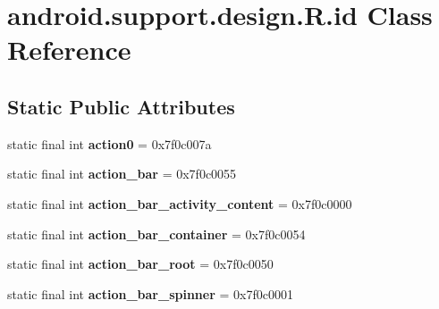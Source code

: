 \hypertarget{classandroid_1_1support_1_1design_1_1_r_1_1id}{}\section{android.\+support.\+design.\+R.\+id Class Reference}
\label{classandroid_1_1support_1_1design_1_1_r_1_1id}
\subsection*{Static Public Attributes}
\begin{DoxyCompactItemize}
\item 
\hypertarget{classandroid_1_1support_1_1design_1_1_r_1_1id_a65ca78d6559d5c73324d48f61d2af87e}{}static final int {\bfseries action0} = 0x7f0c007a\label{classandroid_1_1support_1_1design_1_1_r_1_1id_a65ca78d6559d5c73324d48f61d2af87e}

\item 
\hypertarget{classandroid_1_1support_1_1design_1_1_r_1_1id_a244052aff1f9058e9de1c6c346d3843e}{}static final int {\bfseries action\+\_\+bar} = 0x7f0c0055\label{classandroid_1_1support_1_1design_1_1_r_1_1id_a244052aff1f9058e9de1c6c346d3843e}

\item 
\hypertarget{classandroid_1_1support_1_1design_1_1_r_1_1id_ad64ccac77799d29737c02c55d580556d}{}static final int {\bfseries action\+\_\+bar\+\_\+activity\+\_\+content} = 0x7f0c0000\label{classandroid_1_1support_1_1design_1_1_r_1_1id_ad64ccac77799d29737c02c55d580556d}

\item 
\hypertarget{classandroid_1_1support_1_1design_1_1_r_1_1id_a61d2f497f300510b00f9f341cfb3c078}{}static final int {\bfseries action\+\_\+bar\+\_\+container} = 0x7f0c0054\label{classandroid_1_1support_1_1design_1_1_r_1_1id_a61d2f497f300510b00f9f341cfb3c078}

\item 
\hypertarget{classandroid_1_1support_1_1design_1_1_r_1_1id_a8601162f3d020a91d67ad13ba68f61d9}{}static final int {\bfseries action\+\_\+bar\+\_\+root} = 0x7f0c0050\label{classandroid_1_1support_1_1design_1_1_r_1_1id_a8601162f3d020a91d67ad13ba68f61d9}

\item 
\hypertarget{classandroid_1_1support_1_1design_1_1_r_1_1id_aef2b62b7a707c8bcf579d09add314db0}{}static final int {\bfseries action\+\_\+bar\+\_\+spinner} = 0x7f0c0001\label{classandroid_1_1support_1_1design_1_1_r_1_1id_aef2b62b7a707c8bcf579d09add314db0}


\end{DoxyCompactItemize}
